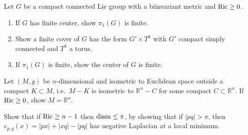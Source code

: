 \begin{remark}
  \label{rem:pet-ch7-ex-20}

  Let $G$ be a compact connected Lie group with a biinvariant metric and
  $\operatorname{Ric}\ge0$.
  \begin{enumerate}
    \item[(1)] If $G$ has finite center, show $\pi_1(G)$ is finite.
    \item[(2)] Show a finite cover of $G$ has the form $G'\times T^k$ with
      $G'$ compact simply connected and $T^k$ a torus.
    \item[(3)] If $\pi_1(G)$ is finite, show the center of $G$ is finite.
  \end{enumerate}
\end{remark}

\begin{remark}
  \label{rem:pet-ch7-ex-21}

  Let $(M,g)$ be $n$-dimensional and isometric to Euclidean space outside a
  compact $K\subset M$, i.e.\ $M-K$ is isometric to $\mathbb{R}^n-C$ for some
  compact $C\subset\mathbb{R}^n$. If $\operatorname{Ric}\ge0$, show $M=\mathbb{R}^n$.
\end{remark}

\begin{remark}
  \label{rem:pet-ch7-ex-22}

  Show that if $\operatorname{Ric}\ge n-1$ then $\operatorname{diam}\le\pi$, by showing that if
  $|pq|>\pi$, then $e_{p,q}(x)=|px|+|xq|-|pq|$ has negative Laplacian at a
  local minimum.
\end{remark}
